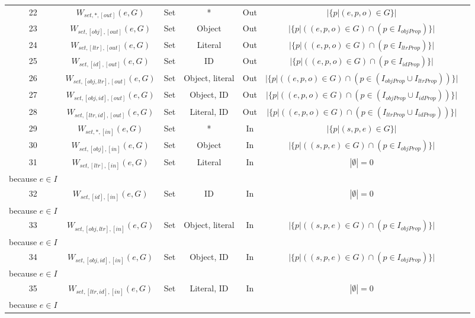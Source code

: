 \begin{center}
{\begin{threeparttable}
\begin{tabular}{|c | c c c c c c |}
        22 & $W_{set,*,[out]}(e,G)$ & Set & * & Out & $|\{p | (e, p, o) \in G\}|$ & \\
        23 & $W_{set,[obj],[out]}(e,G)$ & Set & Object & Out & $|\{p | ((e, p, o) \in G) \cap (p \in I_{objProp})\}|$ & \\
        24 & $W_{set,[ltr],[out]}(e,G)$ & Set & Literal & Out & $|\{p | ((e, p, o) \in G) \cap (p \in I_{ltrProp})\}|$ & \\
        25 & $W_{set,[id],[out]}(e,G)$ & Set & ID & Out & $|\{p | ((e, p, o) \in G) \cap (p \in I_{idProp})\}|$ & \\
        26 & $W_{set,[obj, ltr],[out]}(e,G)$ & Set & Object, literal & Out & $|\{p | ((e, p, o) \in G) \cap (p \in (I_{objProp} \cup I_{ltrProp}))\}|$ & \\
        27 & $W_{set,[obj, id],[out]}(e,G)$ & Set & Object, ID & Out & $|\{p | ((e, p, o) \in G) \cap (p \in (I_{objProp} \cup I_{idProp}))\}|$ & \\
        28 & $W_{set,[ltr, id],[out]}(e,G)$ & Set & Literal, ID & Out & $|\{p | ((e, p, o) \in G) \cap (p \in (I_{ltrProp} \cup I_{idProp}))\}|$ & \\
        29 & $W_{set,*,[in]}(e,G)$ & Set & * & In & $|\{p | (s, p, e) \in G\}|$ & \\
        30 & $W_{set,[obj],[in]}(e,G)$ & Set & Object & In & $|\{p | ((s, p, e) \in G) \cap (p \in I_{objProp})\}|$ & \\
        31 & $W_{set,[ltr],[in]}(e,G)$ & Set & Literal & In & $|\emptyset| = 0$ & \CellWithForceBreak{$p \in I_{objProp}$ \\ because $e \in I$} \\
        32 & $W_{set,[id],[in]}(e,G)$ & Set & ID & In & $|\emptyset| = 0$ & \CellWithForceBreak{$p \in I_{objProp}$ \\ because $e \in I$} \\
        33 & $W_{set,[obj, ltr],[in]}(e,G)$ & Set & Object, literal & In & $|\{p | ((s, p, e) \in G) \cap (p \in I_{objProp})\}|$ & \CellWithForceBreak{$p \in I_{objProp}$ \\ because $e \in I$} \\
        34 & $W_{set,[obj, id],[in]}(e,G)$ & Set & Object, ID & In & $|\{p | ((s, p, e) \in G) \cap (p \in I_{objProp})\}|$ & \CellWithForceBreak{$p \in I_{objProp}$ \\ because $e \in I$} \\
        35 & $W_{set,[ltr, id],[in]}(e,G)$ & Set & Literal, ID & In & $|\emptyset| = 0$ & \CellWithForceBreak{$p \in I_{objProp}$ \\ because $e \in I$} \\

\end{tabular}
\end{threeparttable}}
\end{center}
